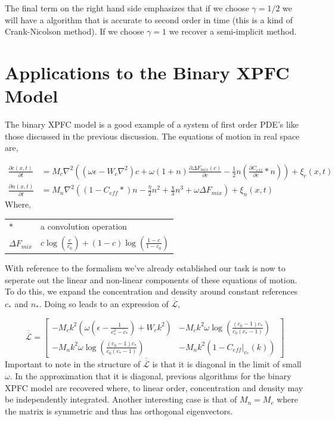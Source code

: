 \documentclass[11pt]{article}
\makeatletter
\newenvironment{conditions}
  {\par\vspace{\abovedisplayskip}\noindent\begin{tabular}{>{$}l<{$} @{${}={}$} l}}
  {\end{tabular}\par\vspace{\belowdisplayskip}}
\newcommand{\f}{\frac}
\newcommand*{\tn}[1]{\overline{\overline{#1}}}
\makeatother
\begin{document}
The final term on the right hand side emphasizes that if we choose $\gamma = 1/2$ we will have a algorithm that is accurate to second order in time (this is a kind of Crank-Nicolson method). If we choose $\gamma = 1$ we recover a semi-implicit method. 

\section{Applications to the Binary XPFC Model}

The binary XPFC model is a good example of a system of first order PDE's like those discussed in the previous discussion. The equations of motion in real space are, 

\begin{align}
	\f{\partial c(x, t)}{\partial t} 
		&= M_c \nabla^2 \left( (\omega\epsilon - W_c\nabla^2) c 
			+ \omega (1 + n) \f{\partial \Delta F_{mix}(c)}{\partial c} 
			- \f{1}{2} n \left(\f{\partial C_{eff}}{\partial c} \ast n\right)
		\right) + \xi_c(x, t) \\
	\f{\partial n(x,t)}{\partial t} &= M_n \nabla^2 \left(
		\left(1 - C_{eff} \ast \right) n	- \f{\eta}{2} n^2 + \f{\chi}{3}n^3 + \omega\Delta F_{mix}
	 \right)  + \xi_n(x, t)
\end{align}
Where,
\begin{conditions}
	\ast & a convolution operation \\
	\Delta F_{mix} & $c\log\left(\f{c}{c_0}\right) + (1-c)\log\left(\f{1-c}{1-c_0}\right)$
\end{conditions}

With reference to the formalism we've already established our task is now to seperate out the linear and non-linear components of these equations of motion. To do this, we expand the concentration and density around constant references $c_\ast$ and $n_\ast$. Doing so leads to an expression of $\tn{\mathcal{L}}$, 

\begin{equation}
	\tn{\mathcal{L}} = \begin{bmatrix}
	-M_c k^2 \left( \omega\left(\epsilon - \f{1}{c_\ast^2 - c_\ast}\right) + W_c k^2\right) & -M_c k^2 \omega \log\left(\f{(c_0-1)c_\ast}{c_0(c_\ast-1)}\right) \\
	-M_n k^2 \omega \log \left(\f{(c_0-1)c_\ast}{c_0(c_\ast-1)}\right) & -M_n k^2 \left( 1-C_{eff}\vert_{c_\ast}(k) \right)
	\end{bmatrix}
\end{equation}
Important to note in the structure of $\tn{\mathcal{L}}$ is that it is diagonal in the limit of small $\omega$. In the approximation that it is diagonal, previous algorithms for the binary XPFC model are recovered where, to linear order, concentration and density may be independently integrated. Another interesting case is that of $M_n = M_c$ where the matrix is symmetric and thus has orthogonal eigenvectors. 
\end{document}
